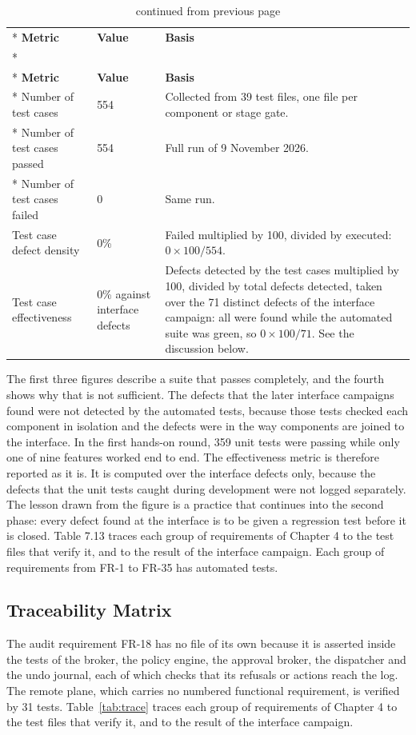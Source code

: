 \documentclass{FastFyp}
\begin{document}
{
\begin{longtable}{|p{4.6cm}|p{2.0cm}|p{6.6cm}|}
\caption{Test metrics.}\label{tab:metrics}\\*
\hline
\textbf{Metric} & \textbf{Value} & \textbf{Basis} \\*
\hline
\endfirsthead
\caption[]{continued from previous page}\\*
\hline
\textbf{Metric} & \textbf{Value} & \textbf{Basis} \\*
\hline
\endhead
\hline
Number of test cases & 554 & Collected from 39 test files, one file per component or stage gate. \\*
\hline
Number of test cases passed & 554 & Full run of 9 November 2026. \\*
\hline
Number of test cases failed & 0 & Same run. \\
\hline
Test case defect density & 0\% & Failed multiplied by 100, divided by executed: $0 \times 100 / 554$. \\
\hline
Test case effectiveness & 0\% against interface defects & Defects detected by the test cases multiplied by 100, divided by total defects detected, taken over the 71 distinct defects of the interface campaign: all were found while the automated suite was green, so $0 \times 100 / 71$. See the discussion below. \\
\hline
\end{longtable}
}

The first three figures describe a suite that passes completely, and the fourth shows why that is not sufficient. The defects that the later interface campaigns found were not detected by the automated tests, because those tests checked each component in isolation and the defects were in the way components are joined to the interface. In the first hands-on round, 359 unit tests were passing while only one of nine features worked end to end. The effectiveness metric is therefore reported as it is. It is computed over the interface defects only, because the defects that the unit tests caught during development were not logged separately. The lesson drawn from the figure is a practice that continues into the second phase: every defect found at the interface is to be given a regression test before it is closed. Table 7.13 traces each group of requirements of Chapter 4 to the test files that verify it, and to the result of the interface campaign. Each group of requirements from FR-1 to FR-35 has automated tests.

\subsection{Traceability Matrix}
The audit requirement FR-18 has no file of its own because it is asserted inside the tests of the broker, the policy engine, the approval broker, the dispatcher and the undo journal, each of which checks that its refusals or actions reach the log. The remote plane, which carries no numbered functional requirement, is verified by 31 tests. Table~\ref{tab:trace} traces each group of requirements of Chapter 4 to the test files that verify it, and to the result of the interface campaign.
\end{document}
